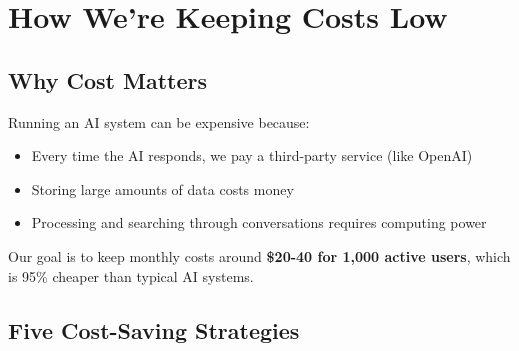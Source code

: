 \documentclass[12pt,a4paper]{article}
\begin{document}
\section{How We're Keeping Costs Low}

\subsection{Why Cost Matters}

Running an AI system can be expensive because:
\begin{itemize}
  \item Every time the AI responds, we pay a third-party service (like OpenAI)
  \item Storing large amounts of data costs money
  \item Processing and searching through conversations requires computing power
\end{itemize}

Our goal is to keep monthly costs around \textbf{\$20-40 for 1,000 active users}, which is 95\% cheaper than typical AI systems.

\subsection{Five Cost-Saving Strategies}
\end{document}
